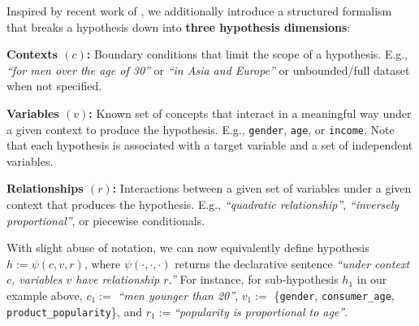 Inspired by recent work of \citet{thompson2023scope}, we additionally introduce a structured formalism that breaks a hypothesis down into \textbf{three hypothesis dimensions}:
\begin{ite}
    \item \textbf{Contexts $(c)$:} Boundary conditions that limit the scope of a hypothesis.
    E.g., \textit{``for men over the age of 30''} or \textit{``in Asia and Europe''} or unbounded/full dataset when not specified.
    \item \textbf{Variables $(v)$:} Known set of 
    concepts that interact in a meaningful way under a given context to produce the hypothesis. E.g., \texttt{gender}, \texttt{age}, or \texttt{income}. Note that each hypothesis is associated with a target variable and a set of independent variables.
    \item \textbf{Relationships $(r)$:} Interactions between a given set of variables under a given context that produces the hypothesis. E.g., \textit{``quadratic relationship''}, \textit{``inversely proportional''}, or piecewise conditionals.
\end{ite}
With slight abuse of notation, we can now equivalently define hypothesis $h:= \psi(c, v, r)$, where $\psi(\cdot,\cdot,\cdot)$ returns the declarative sentence
\textit{``under context $c$, variables $v$ have relationship $r$.''}
For instance, for sub-hypothesis $h_1$ in our example above, $c_1 :=$ \textit{``men younger than 20''}, $v_1 :=$ \{\texttt{gender}, \texttt{consumer\_age}, \texttt{product\_popularity}\}, and $r_1 := 
 $\textit{``popularity is proportional to age''}.


